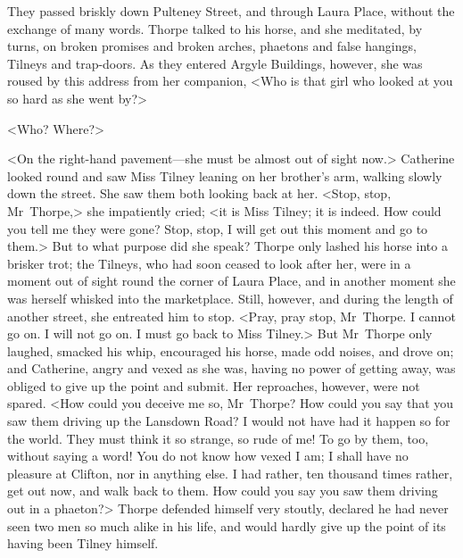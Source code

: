  They passed briskly down Pulteney Street, and through Laura Place, without the exchange of many words. Thorpe talked to his horse, and she meditated, by turns, on broken promises and broken arches, phaetons and false hangings, Tilneys and trap-doors. As they entered Argyle Buildings, however, she was roused by this address from her companion, <Who is that girl who looked at you so hard as she went by?> 

 <Who? Where?> 

 <On the right-hand pavement—she must be almost out of sight now.> Catherine looked round and saw Miss Tilney leaning on her brother's arm, walking slowly down the street. She saw them both looking back at her. <Stop, stop, Mr~Thorpe,> she impatiently cried; <it is Miss Tilney; it is indeed. How could you tell me they were gone? Stop, stop, I will get out this moment and go to them.> But to what purpose did she speak? Thorpe only lashed his horse into a brisker trot; the Tilneys, who had soon ceased to look after her, were in a moment out of sight round the corner of Laura Place, and in another moment she was herself whisked into the marketplace. Still, however, and during the length of another street, she entreated him to stop. <Pray, pray stop, Mr~Thorpe. I cannot go on. I will not go on. I must go back to Miss Tilney.> But Mr~Thorpe only laughed, smacked his whip, encouraged his horse, made odd noises, and drove on; and Catherine, angry and vexed as she was, having no power of getting away, was obliged to give up the point and submit. Her reproaches, however, were not spared. <How could you deceive me so, Mr~Thorpe? How could you say that you saw them driving up the Lansdown Road? I would not have had it happen so for the world. They must think it so strange, so rude of me! To go by them, too, without saying a word! You do not know how vexed I am; I shall have no pleasure at Clifton, nor in anything else. I had rather, ten thousand times rather, get out now, and walk back to them. How could you say you saw them driving out in a phaeton?> Thorpe defended himself very stoutly, declared he had never seen two men so much alike in his life, and would hardly give up the point of its having been Tilney himself. 

